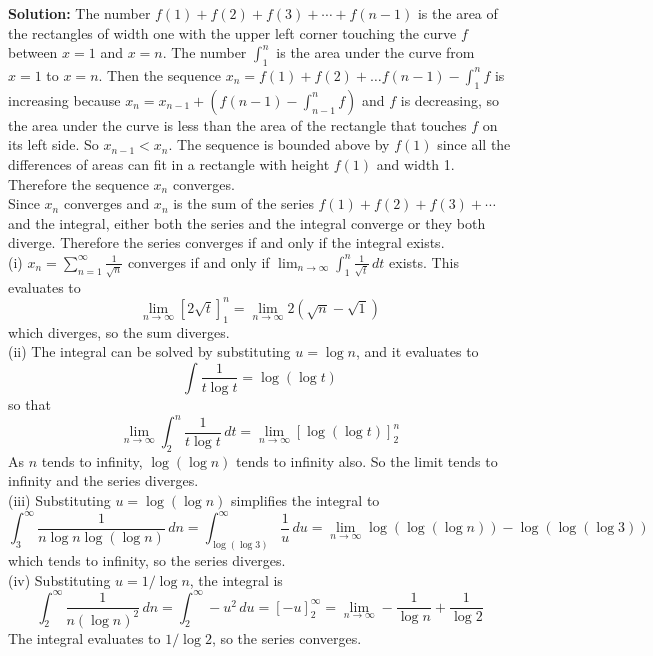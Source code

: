 \documentclass{article}
\newcommand{\solution}[1]{\setlength{\hangindent}{\parindent} \indent\indent \textbf{Solution: }#1\hfill\break}
\begin{document}
\solution{The number $f(1) + f(2) + f(3) + \dotsb + f(n-1)$ is the area of the rectangles of width one with the upper left corner touching the curve $f$ between $x=1$ and $x=n$. The number $\int_1^n$ is the area under the curve from $x=1$ to $x=n$. Then the sequence $x_n = f(1) + f(2) + \dots f(n-1) - \int_1^n f$ is increasing because $x_n = x_{n-1} + (f(n-1)  - \int_{n-1}^n f)$ and $f$ is decreasing, so the area under the curve is less than the area of the rectangle that touches $f$ on its left side. So $x_{n-1} < x_n$. The sequence is bounded above by $f(1)$ since all the differences of areas can fit in a rectangle with height $f(1)$ and width 1. Therefore the sequence $x_n$ converges. \\
\indent Since $x_n$ converges and $x_n$ is the sum of the series $f(1) + f(2) + f(3) + \dotsb$ and the integral, either both the series and the integral converge or they both diverge. Therefore the series converges if and only if the integral exists. \\
\indent (i) $x_n = \sum_{n=1}^\infty \frac{1}{\sqrt n}$ converges if and only if $\lim_{n\to\infty}\int_1^n \frac{1}{\sqrt t} \, dt$ exists. This evaluates to 
$$\lim_{n\to\infty} [2\sqrt{t}]_1^n = \lim_{n\to\infty} 2(\sqrt n - \sqrt 1)$$
which diverges, so the sum diverges. \\%
\indent (ii) The integral can be solved by substituting $u = \log n$, and it evaluates to 
$$\int \frac{1}{t\log t} = \log (\log t)$$
so that 
$$\lim_{n\to \infty} \int_2^n \frac{1}{t\log t}\, dt = \lim_{n\to\infty} \left[\log (\log t)\right]_2^n $$
\indent As $n$ tends to infinity, $\log (\log n)$ tends to infinity also. So the limit tends to infinity and the series diverges. \\ %
\indent (iii) Substituting $u = \log(\log n)$ simplifies the integral to 
$$\int_3^\infty \frac{1}{n\log n \log (\log n)} \, dn = \int_{\log (\log 3)}^{\infty} \frac{1}{u}\, du = \lim_{n\to \infty} \log (\log (\log n)) - \log(\log(\log 3)) $$
which tends to infinity, so the series diverges. \\
\indent (iv) Substituting $u= 1/\log n$, the integral is
$$\int_2^\infty \frac{1}{n(\log n)^2} \, dn= \int_2^\infty -u^2 \, du= \left[-u\right]_2^\infty = \lim_{n\to\infty} -\frac{1}{\log n} + \frac{1}{\log 2}$$
The integral evaluates to $1/\log 2$, so the series converges.}%
\end{document}
